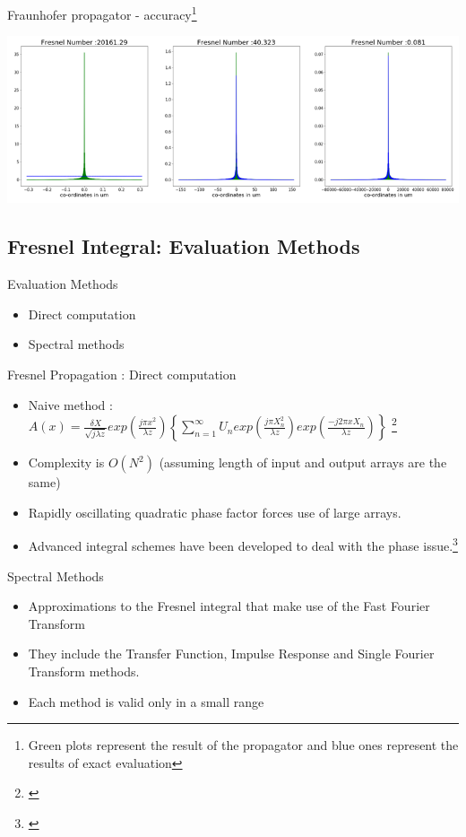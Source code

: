 \documentclass{beamer}
\begin{document}
\begin{frame}{Fraunhofer propagator - accuracy\footnote{Green plots represent the result of the propagator and blue ones represent the results of exact evaluation }}
\begin{center}
	\includegraphics[scale=0.5]{ff}
\end{center}
\end{frame}


\subsection{Fresnel Integral: Evaluation Methods}
\begin{frame}{Evaluation Methods}
\begin{itemize}
	\item {Direct computation}
	\item {Spectral methods}
\end{itemize}
\end{frame}

\begin{frame}{Fresnel Propagation : Direct computation}
\begin{itemize}
	\item Naive method : $A(x) = \frac{\delta X}{\sqrt{j\lambda z}} exp( \frac{j\pi x^{2}}{\lambda z})\left\{\sum_{n=1}^{\infty}U_{n}exp(\frac{j\pi X_{n}^{2}}{\lambda z})exp(\frac{-j2\pi xX_{n}}{\lambda z})\right\}$ \footnote{\cite{Kelly2014}} 
	\item Complexity is $O(N^{2})$ (assuming length of input and output arrays are the same)
	\item Rapidly oscillating quadratic phase factor forces use of large arrays.
	\item Advanced integral schemes have been developed to deal with the phase issue.\footnote{\cite{Koc2010}}
\end{itemize}
\end{frame}


\begin{frame}{Spectral Methods}
\begin{itemize}
	\item Approximations to the Fresnel integral that make use of the Fast Fourier Transform
	\item {They include the Transfer Function, Impulse Response and Single Fourier Transform methods.}
	\item {Each method is valid only in a small range}
\end{itemize}
\end{frame}
\end{document}
